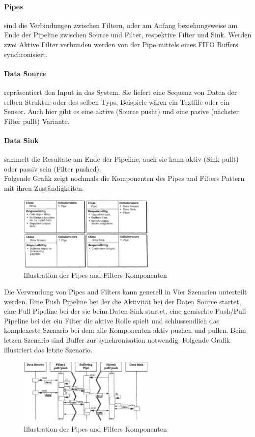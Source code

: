 \paragraph{Pipes} sind die Verbindungen zwischen Filtern, oder am Anfang beziehungsweise am Ende der Pipeline zwischen Source und Filter, respektive Filter und Sink. Werden zwei Aktive Filter verbunden werden von der Pipe mittels eines FIFO Buffers synchronisiert.
\paragraph{Data Source} repräsentiert den Input in das System. Sie liefert eine Sequenz von Daten der selben Struktur oder des selben Typs. Beispiele wären ein Textfile oder ein Sensor. Auch hier gibt es eine aktive (Source pusht) und eine pasive (nächster Filter pullt) Variante.
\paragraph{Data Sink} sammelt die Resultate am Ende der Pipeline, auch sie kann aktiv (Sink pullt) oder passiv sein (Filter pushed).\\
Folgende Grafik zeigt nochmals die Komponenten des Pipes and Filters Pattern mit ihren Zuständigkeiten.
\begin{figure}[H]
  \centering
  \includegraphics[width=0.6\textwidth]{figures/01-pipesandfilters-1}
  \caption{Illustration der Pipes and Filters Komponenten}
\end{figure}
Die Verwendung von Pipes and Filters kann generell in Vier Szenarien unterteilt werden. Eine Push Pipeline bei der die Aktivität bei der Daten Source startet, eine Pull Pipeline bei der sie beim Daten Sink startet, eine gemischte Push/Pull Pipeline bei der ein Filter die aktive Rolle spielt und schlussendlich das komplexeste Szenario bei dem alle Komponenten aktiv pushen und pullen. Beim letzen Szenario sind Buffer zur synchronisation notwendig. Folgende Grafik illustriert das letzte Szenario.
\begin{figure}[H]
	\centering
	\includegraphics[width=0.6\textwidth]{figures/01-pipesandfilters-2}
	\caption{Illustration der Pipes and Filters Komponenten}
\end{figure}
